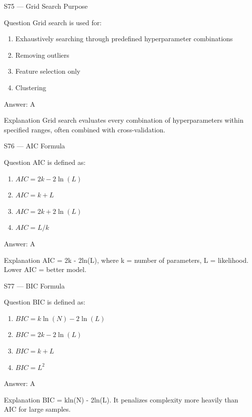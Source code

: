 \documentclass[aspectratio=169,8pt]{beamer}
\begin{document}
	\begin{frame}{S75 --- Grid Search Purpose}
		\begin{block}{Question}
			Grid search is used for:
			\begin{enumerate}
				\item Exhaustively searching through predefined hyperparameter combinations
				\item Removing outliers
				\item Feature selection only
				\item Clustering
			\end{enumerate}
		\end{block}
		\begin{exampleblock}{Answer: A}\end{exampleblock}
		\begin{block}{Explanation}
			Grid search evaluates every combination of hyperparameters within specified ranges, often combined with cross-validation.
		\end{block}
	\end{frame}
	
	\begin{frame}{S76 --- AIC Formula}
		\begin{block}{Question}
			AIC is defined as:
			\begin{enumerate}
				\item $AIC = 2k - 2\ln(L)$
				\item $AIC = k + L$
				\item $AIC = 2k + 2\ln(L)$
				\item $AIC = L/k$
			\end{enumerate}
		\end{block}
		\begin{exampleblock}{Answer: A}\end{exampleblock}
		\begin{block}{Explanation}
			AIC = 2k - 2ln(L), where k = number of parameters, L = likelihood. Lower AIC = better model.
		\end{block}
	\end{frame}
	
	\begin{frame}{S77 --- BIC Formula}
		\begin{block}{Question}
			BIC is defined as:
			\begin{enumerate}
				\item $BIC = k\ln(N) - 2\ln(L)$
				\item $BIC = 2k - 2\ln(L)$
				\item $BIC = k + L$
				\item $BIC = L^2$
			\end{enumerate}
		\end{block}
		\begin{exampleblock}{Answer: A}\end{exampleblock}
		\begin{block}{Explanation}
			BIC = kln(N) - 2ln(L). It penalizes complexity more heavily than AIC for large samples.
		\end{block}
	\end{frame}
	
\end{document}

